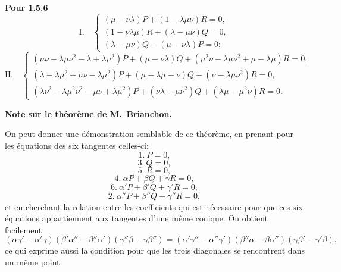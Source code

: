 \documentclass[12pt,a4paper]{article}
\begin{document}
\bigskip
\noindent\textbf{Pour 1.5.6}
\[
\text{I.}\quad\begin{cases} (\mu - \nu\lambda) P + (1 - \lambda\mu\nu) R = 0,\\ (1 - \nu\lambda\mu) R + (\lambda - \mu\nu) Q = 0,\\ (\lambda - \mu\nu) Q - (\mu - \nu\lambda) P = 0; \end{cases}
\]
\[
\text{II.}\quad\begin{cases} (\mu\nu - \lambda\mu\nu^2 - \lambda + \lambda\mu^2) P + (\mu - \nu\lambda) Q + (\mu^2\nu - \lambda\mu\nu^2 + \mu - \lambda\mu) R = 0,\\ (\lambda - \lambda\mu^2 + \mu\nu - \lambda\mu^2) P + (\mu - \lambda\mu - \nu) Q + (\nu - \lambda\mu\nu^2) R = 0,\\ (\lambda\nu^2 - \lambda\mu^2\nu^2 - \mu\nu + \lambda\mu^2) P + (\nu\lambda - \mu\nu^2) Q + (\lambda\mu - \mu^2\nu) R = 0. \end{cases}
\]

\bigskip
\noindent\textbf{Note sur le th\'eor\`eme de M.~Brianchon.}
\medskip

On peut donner une d\'emonstration semblable de ce th\'eor\`eme, en prenant pour les \'equations des six tangentes celles-ci:
\[
1.\ P = 0,
\]
\[
3.\ Q = 0,
\]
\[
5.\ R = 0,
\]
\[
4.\ \alpha P + \beta Q + \gamma R = 0,
\]
\[
6.\ \alpha' P + \beta' Q + \gamma' R = 0,
\]
\[
2.\ \alpha'' P + \beta'' Q + \gamma'' R = 0,
\]
et en cherchant la relation entre les coefficients qui est n\'ecessaire pour que ces six \'equations appartiennent aux tangentes d'une m\^eme conique. On obtient facilement
\[
(\alpha\gamma' - \alpha'\gamma)(\beta'\alpha'' - \beta''\alpha')(\gamma''\beta - \gamma\beta'') = (\alpha'\gamma'' - \alpha''\gamma')(\beta''\alpha - \beta\alpha'')(\gamma\beta' - \gamma'\beta),
\]
ce qui exprime aussi la condition pour que les trois diagonales se rencontrent dans un m\^eme point.

\end{document}
